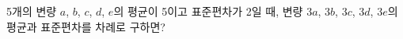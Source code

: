 5개의 변량 $a$, $b$, $c$, $d$, $e$의 평균이 5이고 표준편차가 2일 때, 변량 $3a$, $3b$, $3c$, $3d$, $3e$의 평균과 표준편차를 차례로 구하면?
